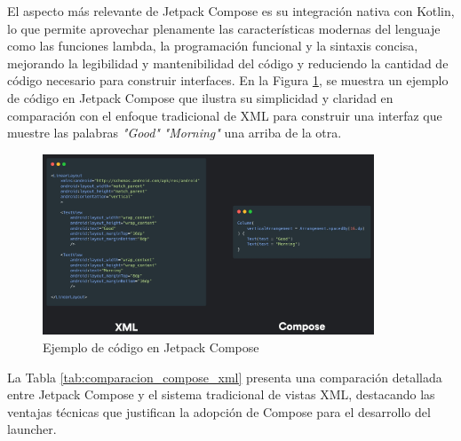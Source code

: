 El aspecto más relevante de Jetpack Compose es su integración nativa con Kotlin, lo que permite aprovechar plenamente las características modernas del lenguaje como las funciones lambda, la programación funcional y la sintaxis concisa, mejorando la legibilidad y mantenibilidad del código y reduciendo la cantidad de código necesario para construir interfaces. En la Figura \ref{fig:compose_vs_xml}, se muestra un ejemplo de código en Jetpack Compose que ilustra su simplicidad y claridad en comparación con el enfoque tradicional de XML para construir una interfaz que muestre las palabras \textit{"Good"} \textit{"Morning"} una arriba de la otra.

\begin{figure}[H]
\caption{Ejemplo de código en Jetpack Compose}
\label{fig:compose_vs_xml}
\includegraphics[width=0.88\textwidth]{Figuras/compose_vs_xml.jpg}
\centering
\end{figure}

\pagebreak

La Tabla \ref{tab:comparacion_compose_xml} presenta una comparación detallada entre Jetpack Compose y el sistema tradicional de vistas XML, destacando las ventajas técnicas que justifican la adopción de Compose para el desarrollo del launcher.

